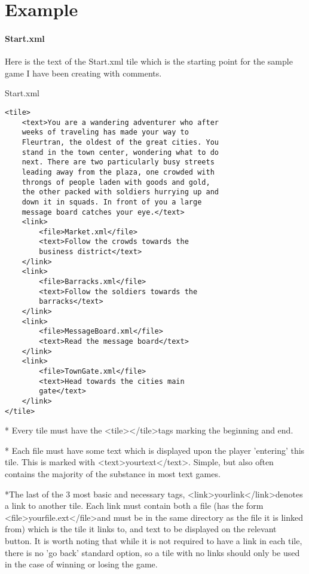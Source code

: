 \documentclass[11pt]{article}
\begin{document}
\section{Example}

\paragraph{Start.xml}

Here is the text of the Start.xml tile which is the starting point for the sample game I have been creating with comments.

Start.xml
\begin{lstlisting}[frame=single]
<tile>
	<text>You are a wandering adventurer who after 
	weeks of traveling has made your way to 
	Fleurtran, the oldest of the great cities. You 
	stand in the town center, wondering what to do 
	next. There are two particularly busy streets 
	leading away from the plaza, one crowded with 
	throngs of people laden with goods and gold, 
	the other packed with soldiers hurrying up and 
	down it in squads. In front of you a large 
	message board catches your eye.</text>
	<link>
		<file>Market.xml</file>
		<text>Follow the crowds towards the 
		business district</text>
	</link>
	<link>
		<file>Barracks.xml</file>
		<text>Follow the soldiers towards the 
		barracks</text>
	</link>
	<link>
		<file>MessageBoard.xml</file>
		<text>Read the message board</text>
	</link>
	<link>
		<file>TownGate.xml</file>
		<text>Head towards the cities main 
		gate</text>
	</link>
</tile>
\end{lstlisting}

* Every tile must have the \textless tile\textgreater \textless /tile\textgreater tags marking the beginning and end.

* Each file must have some text which is displayed upon the player 'entering' this tile. This is marked with \textless text\textgreater yourtext\textless /text\textgreater . Simple, but also often contains the majority of the substance in most text games.

*The last of the 3 most basic and necessary tags, \textless link\textgreater yourlink\textless /link\textgreater  denotes a link to another tile. Each link must contain both a file (has the form \textless file\textgreater yourfile.ext\textless /file\textgreater and must be in the same directory as the file it is linked from) which is the tile it links to, and text to be displayed on the relevant button. It is worth noting that while it is not required to have a link in each tile, there is no 'go back' standard option, so a tile with no links should only be used in the case of winning or losing the game.
\end{document}
